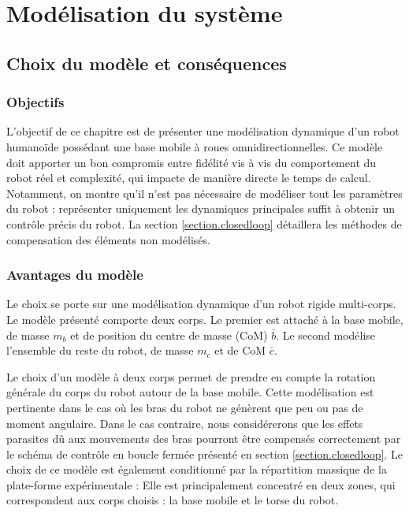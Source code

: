 \chapter{Modélisation du système}
\label{chapitre.modele}
\section{Choix du modèle et conséquences}
	\subsection{Objectifs}
		L'objectif de ce chapitre est de présenter une modélisation dynamique d'un robot humanoïde possédant une base mobile à roues omnidirectionnelles. 
		Ce modèle doit apporter un bon compromis entre fidélité vis à vis du comportement du robot réel et complexité, qui impacte de manière directe le temps de calcul.
		Notamment, on montre qu'il n'est pas nécessaire de modéliser tout les paramètres du robot : représenter uniquement les dynamiques principales suffit à obtenir un contrôle précis du robot. 
		La section \ref{section.closedloop} détaillera les méthodes de compensation des éléments non modélisés.
	
		
	\subsection{Avantages du modèle}
		
		Le choix se porte sur une modélisation dynamique d'un robot rigide multi-corps. 
		Le modèle présenté  comporte deux corps. Le premier est attaché à la base mobile, de masse $m_b$ et de position du centre de masse (CoM) $\bar{b}$.
		Le second modélise l'ensemble du reste du robot, de masse $m_c$ et de CoM $\bar{c}$.
		
		Le choix d'un modèle à deux corps permet de prendre en compte la rotation générale du corps du robot autour de la base mobile.
		Cette modélisation est pertinente dans le cas où les bras du robot ne génèrent que peu ou pas de moment angulaire.
		Dans le cas contraire, nous considérerons que les effets parasites dû aux mouvements des bras pourront être compensés correctement par le schéma de contrôle en boucle fermée présenté en section \ref{section.closedloop}.
		Le choix de ce modèle est également conditionné par la répartition massique de la plate-forme expérimentale :
		Elle est principalement concentré en deux zones, qui correspondent aux corps choisis : la base mobile et le torse du robot.	
	
